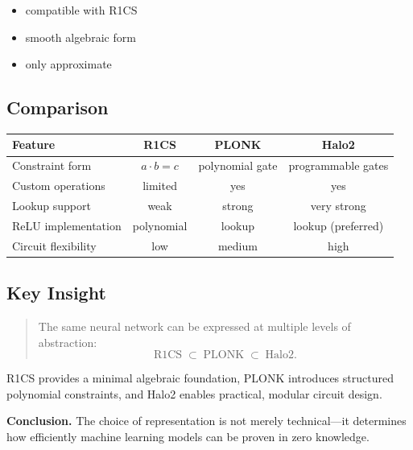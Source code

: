 \begin{itemize}
\item compatible with R1CS
\item smooth algebraic form
\item only approximate
\end{itemize}

\subsection{Comparison}

\begin{center}
\begin{tabular}{l|c|c|c}
Feature & R1CS & PLONK & Halo2 \\
\hline
Constraint form & $a\cdot b=c$ & polynomial gate & programmable gates \\
Custom operations & limited & yes & yes \\
Lookup support & weak & strong & very strong \\
ReLU implementation & polynomial & lookup & lookup (preferred) \\
Circuit flexibility & low & medium & high
\end{tabular}
\end{center}

\subsection{Key Insight}

\begin{quote}
The same neural network can be expressed at multiple levels of abstraction:
\[
\text{R1CS} \;\subset\; \text{PLONK} \;\subset\; \text{Halo2}.
\]
\end{quote}

\noindent
R1CS provides a minimal algebraic foundation,  
PLONK introduces structured polynomial constraints,  
and Halo2 enables practical, modular circuit design.

\medskip

\noindent
\textbf{Conclusion.}  
The choice of representation is not merely technical—it determines how efficiently machine learning models can be proven in zero knowledge.